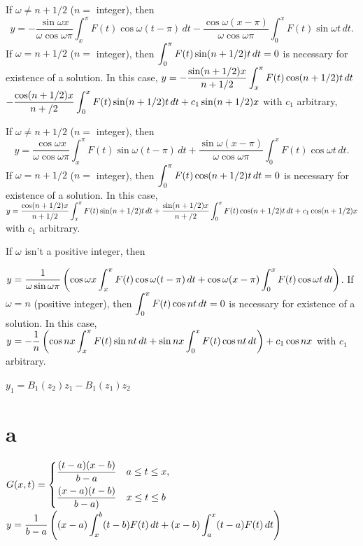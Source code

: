 \smallskip
{} If $\omega\ne n+1/2$\;   ($n=$ integer), then
\[
y=-\frac{\sin\omega x}{\omega\cos\omega
\pi}\int_{x}^{\pi}F(t)\cos\omega(t-\pi)\,dt
-\frac{\cos\omega(x-\pi)}{\omega\cos\omega\pi}\int_{0}^{x}F(t)\sin\omega
t\,dt.
\]
If $\omega= n+1/2$ ($n=$ integer), then
$\displaystyle{\int_{0}^{\pi}F(t)\sin(n+1/2)t\,dt=0}$
is necessary for existence of a solution. In this case,
$y=-\displaystyle{\frac{\sin(n+1/2)x}{n+1/2}\int_{x}^{\pi}F(t)\cos(n+1/2)t\,dt}$
$-\displaystyle{\frac{\cos(n+1/2)x}{n+/2}\int_{0}^{x}F(t)\sin(n+1/2)t\,dt
+c_{1}\sin(n+1/2)x}$ with $c_{1}$ arbitrary,

\smallskip

 If $\omega\ne n+1/2$\;   ($n=$ integer), then
\[
y=\frac{\cos\omega x}{\omega\cos\omega
\pi}\int_{x}^{\pi}F(t)\sin\omega(t-\pi)\,dt
+\frac{\sin\omega(x-\pi)}{\omega\cos\omega\pi}\int_{0}^{x}F(t)\cos\omega
t\,dt.
\]
If $\omega= n+1/2$ ($n=$ integer), then
$\displaystyle{\int_{0}^{\pi}F(t)\cos(n+1/2)t\,dt=0}$
is necessary for existence of a solution. In this case,
$y=\displaystyle{\frac{\cos(n+1/2)x}{n+1/2}\int_{x}^{\pi}F(t)\sin(n+1/2)t\,dt}+\displaystyle{\frac{\sin(n+1/2)x}{n+/2}\int_{0}^{x}F(t)\cos(n+1/2)t\,dt
+c_{1}\cos(n+1/2)x}$
with $c_{1}$ arbitrary.

\smallskip

 If $\omega$ isn't  a positive integer, then

\smallskip
\quad \quad
$y=\displaystyle{\frac{1}{\omega\sin\omega\pi}
\left(\cos\omega x\int_{x}^{\pi}F(t)\cos\omega(t-\pi)\,dt
+\cos\omega(x-\pi)\int_{0}^{x}F(t)\cos\omega t\,dt\right)}$.
If $\omega=n$ (positive integer), then $\displaystyle{\int_{0}^{\pi}F(t)\cos
nt\,dt=0}$ is necessary for existence of a solution. In this case,
$y=-\displaystyle{\frac{1}{n}\left(\cos nx\int_{x}^{\pi}F(t)\sin nt\,dt
+\sin nx\int_{0}^{x} F(t)\cos nt\,dt\right) +c_{1}\cos nx}$
 with $c_{1}$ arbitrary.

\medskip

  $y_{1}=B_{1}(z_{2})z_{1}-B_{1}(z_{1})z_{2}$

\smallskip

 \part{a}
$G(x,t)=
\begin{cases}
\displaystyle{\frac{(t-a)(x-b)}{b-a}} &a\le t\le x,\\[.11in]
\displaystyle{\frac{(x-a)(t-b)}{b-a)}}&x\le t\le b
\end{cases}$
$y=\displaystyle{\frac{1}{b-a}\left((x-a)\int_{x}^{b}(t-b)F(t)\,dt+(x-b)\int_{a}^{x}(t-a)F(t)\,dt\right)}$
